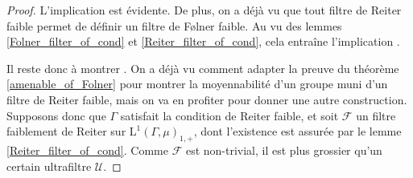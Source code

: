 \documentclass[a4paper,12pt]{article}
\renewcommand{\implies}{\Rightarrow}
\begin{document}
\begin{proof}
    L'implication \framebox{$(\ref{amenable_TFAE/strong_Folner})\implies(\ref{amenable_TFAE/weak_Folner})$} est évidente.
    De plus, on a déjà vu que tout filtre de Reiter faible permet de définir un filtre de F\o{}lner faible. Au vu des lemmes 
    \ref{Folner_filter_of_cond} et \ref{Reiter_filter_of_cond}, cela entraîne l'implication 
    \framebox{$(\ref{amenable_TFAE/weak_Folner})\implies(\ref{amenable_TFAE/weak_Reiter})$}. 

    Il reste donc à montrer \framebox{$(\ref{amenable_TFAE/weak_Reiter})\implies(\ref{amenable_TFAE/amenable})$}. On a déjà vu comment 
    adapter la preuve du théorème \ref{amenable_of_Folner} pour montrer la moyennabilité d'un groupe muni d'un filtre de Reiter 
    faible, mais on va en profiter pour donner une autre construction. Supposons donc que $\Gamma$ satisfait la condition de Reiter faible,
    et soit $\mathscr{F}$ un filtre faiblement de Reiter sur $\mathrm{L}^1(\Gamma, \mu)_{1, +}$, dont l'existence est assurée par le lemme
    \ref{Reiter_filter_of_cond}. Comme $\mathscr{F}$ est non-trivial, il est plus grossier qu'un certain ultrafiltre $\mathscr{U}$. 


\end{proof}
\end{document}
